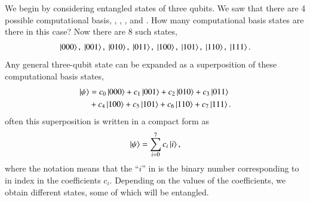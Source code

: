 We begin by considering entangled states of three qubits.
We saw that there are 4 possible computational basis, , , , and .
How many computational basis states are there in this case?
Now there are 8 such states,
\begin{align}
    \left| 000 \right\rangle, \; \left| 001 \right\rangle, \; \left| 010 \right\rangle, \; \left| 011 \right\rangle, \; \left| 100 \right\rangle, \; \left| 101 \right\rangle, \; \left| 110 \right\rangle, \; \left| 111 \right\rangle.
\end{align}
Any general three-qubit state can be expanded as a superposition of these computational basis states,
\begin{align}
    \left| \psi \right\rangle & = c_0\left| 000 \right\rangle + c_1\left| 001 \right\rangle + c_2\left| 010 \right\rangle + c_3\left| 011 \right\rangle \nonumber\\
    & + c_4\left| 100 \right\rangle + c_5\left| 101 \right\rangle + c_6\left| 110 \right\rangle + c_7\left| 111 \right\rangle.
\end{align}
often this superposition is written in a compact form as
\begin{equation}
    \left| \psi \right\rangle = \sum_{i=0}^7 c_i \left| i \right\rangle,
\end{equation}
where the notation means that the ``$i$'' in  is the binary number corresponding to in index in the coefficients $c_i$.
Depending on the values of the coefficients, we obtain different states, some of which will be entangled.

